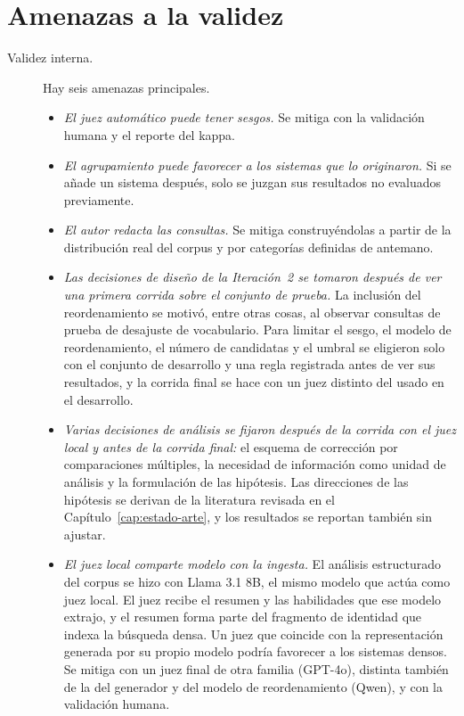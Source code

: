 \section{Amenazas a la validez}
\label{sec:met-validez}

\begin{description}
    \item[Validez interna.] Hay seis amenazas principales.
    \begin{itemize}
        \item \emph{El juez automático puede tener sesgos.} Se mitiga con la validación humana y el reporte del kappa.
        \item \emph{El agrupamiento puede favorecer a los sistemas que lo originaron.} Si se añade un sistema después, solo se juzgan sus resultados no evaluados previamente.
        \item \emph{El autor redacta las consultas.} Se mitiga construyéndolas a partir de la distribución real del corpus y por categorías definidas de antemano.
        \item \emph{Las decisiones de diseño de la Iteración~2 se tomaron después de ver una primera corrida sobre el conjunto de prueba.} La inclusión del reordenamiento se motivó, entre otras cosas, al observar consultas de prueba de desajuste de vocabulario. Para limitar el sesgo, el modelo de reordenamiento, el número de candidatas y el umbral se eligieron solo con el conjunto de desarrollo y una regla registrada antes de ver sus resultados, y la corrida final se hace con un juez distinto del usado en el desarrollo.
        \item \emph{Varias decisiones de análisis se fijaron después de la corrida con el juez local y antes de la corrida final:} el esquema de corrección por comparaciones múltiples, la necesidad de información como unidad de análisis y la formulación de las hipótesis. Las direcciones de las hipótesis se derivan de la literatura revisada en el Capítulo~\ref{cap:estado-arte}, y los resultados se reportan también sin ajustar.
        \item \emph{El juez local comparte modelo con la ingesta.} El análisis estructurado del corpus se hizo con Llama 3.1 8B, el mismo modelo que actúa como juez local. El juez recibe el resumen y las habilidades que ese modelo extrajo, y el resumen forma parte del fragmento de identidad que indexa la búsqueda densa. Un juez que coincide con la representación generada por su propio modelo podría favorecer a los sistemas densos. Se mitiga con un juez final de otra familia (GPT-4o), distinta también de la del generador y del modelo de reordenamiento (Qwen), y con la validación humana.

\end{itemize}
\end{description}
